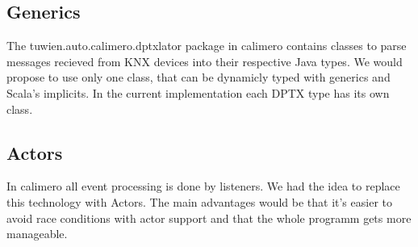 \subsection{Generics}
The tuwien.auto.calimero.dptxlator package in calimero contains classes to parse messages recieved from KNX devices into their respective Java types. We would propose to use only one class, that can be dynamicly typed with generics and Scala's implicits. In the current implementation each DPTX type has its own class.

\subsection{Actors}
In calimero all event processing is done by listeners. We had the idea to replace this technology with Actors. The main advantages would be that it's easier to avoid race conditions with actor support and that the whole programm gets more manageable.
